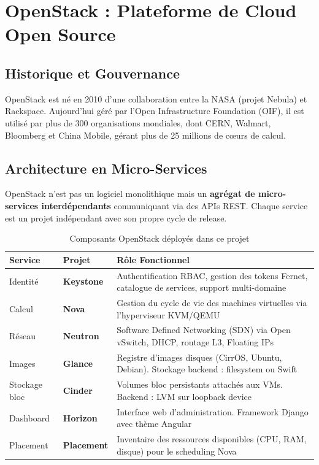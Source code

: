 \documentclass[12pt,a4paper,oneside]{book}
\begin{document}
\section{OpenStack : Plateforme de Cloud Open Source}

\subsection{Historique et Gouvernance}
OpenStack est n\'e en 2010 d'une collaboration entre la NASA (projet Nebula) et Rackspace. Aujourd'hui g\'er\'e par l'Open Infrastructure Foundation (OIF), il est utilis\'e par plus de 300 organisations mondiales, dont CERN, Walmart, Bloomberg et China Mobile, g\'erant plus de 25 millions de c\oe urs de calcul.

\subsection{Architecture en Micro-Services}
OpenStack n'est pas un logiciel monolithique mais un \textbf{agr\'egat de micro-services interd\'ependants} communiquant via des APIs REST. Chaque service est un projet ind\'ependant avec son propre cycle de release.

\begin{table}[H]
\centering
\caption{Composants OpenStack d\'eploy\'es dans ce projet}
\begin{tabularx}{\textwidth}{|l|l|X|}
\hline
\textbf{Service} & \textbf{Projet} & \textbf{R\^ole Fonctionnel} \\
\hline
Identit\'e & \textbf{Keystone} & Authentification RBAC, gestion des tokens Fernet, catalogue de services, support multi-domaine \\
\hline
Calcul & \textbf{Nova} & Gestion du cycle de vie des machines virtuelles via l'hyperviseur KVM/QEMU \\
\hline
R\'eseau & \textbf{Neutron} & Software Defined Networking (SDN) via Open vSwitch, DHCP, routage L3, Floating IPs \\
\hline
Images & \textbf{Glance} & Registre d'images disques (CirrOS, Ubuntu, Debian). Stockage backend : filesystem ou Swift \\
\hline
Stockage bloc & \textbf{Cinder} & Volumes bloc persistants attach\'es aux VMs. Backend : LVM sur loopback device \\
\hline
Dashboard & \textbf{Horizon} & Interface web d'administration. Framework Django avec th\`eme Angular \\
\hline
Placement & \textbf{Placement} & Inventaire des ressources disponibles (CPU, RAM, disque) pour le scheduling Nova \\
\hline
\end{tabularx}
\label{tab:openstack_components}
\end{table}
\end{document}
